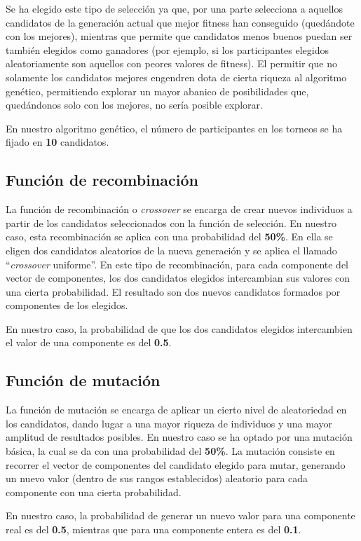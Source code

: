 Se ha elegido este tipo de selección ya que, por una parte selecciona a aquellos candidatos de la generación actual que mejor fitness han conseguido (quedándote con los mejores), mientras que permite que candidatos menos buenos puedan ser también elegidos como ganadores
(por ejemplo, si los participantes elegidos aleatoriamente son aquellos con peores valores de fitness). El permitir que no solamente los candidatos mejores engendren dota de cierta riqueza al algoritmo genético, permitiendo explorar un mayor abanico de posibilidades
que, quedándonos solo con los mejores, no sería posible explorar.

En nuestro algoritmo genético, el número de participantes en los torneos se ha fijado en \textbf{10} candidatos.

\subsection{Función de recombinación}
La función de recombinación o \textit{crossover} se encarga de crear nuevos individuos a partir de los candidatos seleccionados con la función de selección. En nuestro caso, esta recombinación se aplica con una probabilidad del \textbf{50\%}. En ella se eligen dos candidatos aleatorios de la nueva
generación y se aplica el llamado ``\textit{crossover} uniforme''. En este tipo de recombinación, para cada componente del vector de componentes, los dos candidatos elegidos intercambian sus valores con una cierta probabilidad. El resultado son dos nuevos candidatos formados por componentes de los
elegidos.

En nuestro caso, la probabilidad de que los dos candidatos elegidos intercambien el valor de una componente es del \textbf{0.5}.

\subsection{Función de mutación}
La función de mutación se encarga de aplicar un cierto nivel de aleatoriedad en los candidatos, dando lugar a una mayor riqueza de individuos y una mayor amplitud de resultados posibles. En nuestro caso se ha optado por una mutación básica, la cual se da con una probabilidad del \textbf{50\%}.
La mutación consiste en recorrer el vector de componentes del candidato elegido para mutar, generando un nuevo valor (dentro de sus rangos establecidos) aleatorio para cada componente con una cierta probabilidad.

En nuestro caso, la probabilidad de generar un nuevo valor para una componente real es del \textbf{0.5}, mientras que para una componente entera es del \textbf{0.1}.

